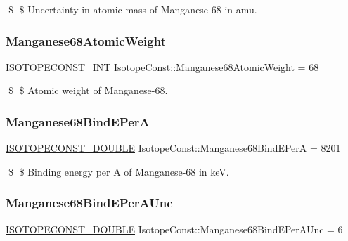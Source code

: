\$ \$ Uncertainty in atomic mass of Manganese-\/68 in amu. \mbox{\label{group___isotope_const-_manganese-_mn68_gac562ee46774d0b42c9c8a534da67fbdc}} 
\subsubsection{\texorpdfstring{Manganese68\+Atomic\+Weight}{Manganese68AtomicWeight}}
{\footnotesize\ttfamily \mbox{\hyperlink{group___isotope_const-_macros_ga5f18360b3e99483a35c32d789e62621c}{I\+S\+O\+T\+O\+P\+E\+C\+O\+N\+S\+T\+\_\+\+I\+NT}} Isotope\+Const\+::\+Manganese68\+Atomic\+Weight = 68}

\$ \$ Atomic weight of Manganese-\/68. \mbox{\label{group___isotope_const-_manganese-_mn68_ga008d3cfc39bc8afd995bc1718016a574}} 
\subsubsection{\texorpdfstring{Manganese68\+Bind\+E\+PerA}{Manganese68BindEPerA}}
{\footnotesize\ttfamily \mbox{\hyperlink{group___isotope_const-_macros_ga8f45a7272ce02c0b4c65c44636ed719a}{I\+S\+O\+T\+O\+P\+E\+C\+O\+N\+S\+T\+\_\+\+D\+O\+U\+B\+LE}} Isotope\+Const\+::\+Manganese68\+Bind\+E\+PerA = 8201}

\$ \$ Binding energy per A of Manganese-\/68 in keV. \mbox{\label{group___isotope_const-_manganese-_mn68_gae781e27ea185ec71e57911a6e971d178}} 
\subsubsection{\texorpdfstring{Manganese68\+Bind\+E\+Per\+A\+Unc}{Manganese68BindEPerAUnc}}
{\footnotesize\ttfamily \mbox{\hyperlink{group___isotope_const-_macros_ga8f45a7272ce02c0b4c65c44636ed719a}{I\+S\+O\+T\+O\+P\+E\+C\+O\+N\+S\+T\+\_\+\+D\+O\+U\+B\+LE}} Isotope\+Const\+::\+Manganese68\+Bind\+E\+Per\+A\+Unc = 6}

